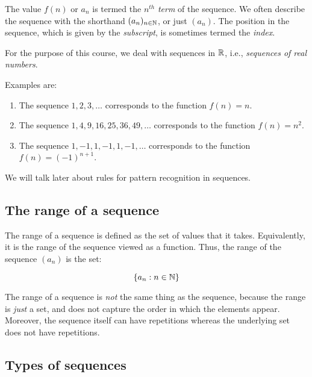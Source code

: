 \documentclass{amsart}
\begin{document}
The value $f(n)$ or $a_n$ is termed the $n^{th}$ {\em term} of the
sequence. We often describe the sequence with the shorthand $(a_n)_{n
\in \mathbb{N}}$, or just $(a_n)$. The position in the sequence, which is
given by the {\em subscript}, is sometimes termed the {\em index}.

For the purpose of this course, we deal with sequences in $\mathbb{R}$, i.e.,
{\em sequences of real numbers}.

Examples are:

\begin{enumerate}
\item The sequence $1,2,3,\dots$ corresponds to the function $f(n) = n$.
\item The sequence $1,4,9,16,25,36,49,\dots$ corresponds to the
  function $f(n) = n^2$.
\item The sequence $1,-1,1,-1,1,-1,\dots$ corresponds to the function
  $f(n) = (-1)^{n+1}$.
\end{enumerate}

We will talk later about rules for pattern recognition in sequences.

\subsection{The range of a sequence}

The range of a sequence is defined as the set of values that it
takes. Equivalently, it is the range of the sequence viewed as a
function. Thus, the range of the sequence $(a_n)$ is the set:

$$\{ a_n : n \in \mathbb{N} \}$$

The range of a sequence is {\em not} the same thing as the sequence,
because the range is {\em just} a set, and does not capture the order
in which the elements appear. Moreover, the sequence itself can have
repetitions whereas the underlying set does not have repetitions.
\subsection{Types of sequences}
\end{document}
